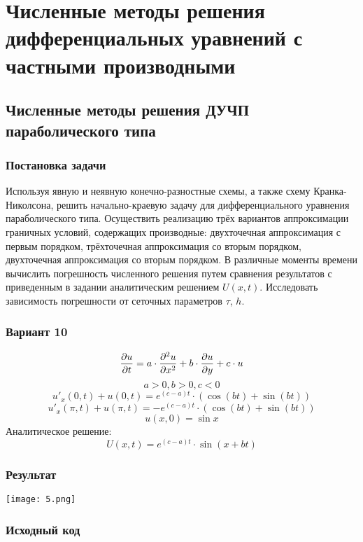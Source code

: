 \graphicspath{{images/}}

\section{Численные методы решения дифференциальных уравнений с частными производными}

\subsection{Численные методы решения ДУЧП параболического типа}

\subsubsection{Постановка задачи}
Используя явную и неявную конечно-разностные схемы, а также схему Кранка-Николсона, решить начально-краевую задачу для дифференциального уравнения параболического типа. Осуществить реализацию трёх вариантов аппроксимации граничных условий, содержащих производные: двухточечная аппроксимация с первым порядком, трёхточечная аппроксимация со вторым порядком, двухточечная аппроксимация со вторым порядком. В различные моменты времени вычислить погрешность численного решения путем сравнения результатов с приведенным в задании аналитическим решением $U(x, t)$. Исследовать зависимость погрешности от сеточных параметров $\tau$, $h$.

\subsubsection{Вариант 10}
$$ {{\partial u} \over {\partial t}} = a \cdot {{\partial^2 u} \over {\partial x^2}} + b \cdot {{\partial u} \over {\partial y}} + c \cdot u $$
$$ a > 0, b > 0, c < 0 $$
$$ u'_x(0, t) + u(0, t) = e ^ {(c - a) t} \cdot (\cos(bt) + \sin(bt)) $$
$$ u'_x(\pi, t) + u(\pi, t) = -e ^ {(c - a) t} \cdot (\cos(bt) + \sin(bt)) $$
$$ u(x, 0) = \sin{x} $$
Аналитическое решение:
$$ U(x, t) = e ^ {(c - a) t} \cdot \sin(x + bt) $$
\pagebreak

\subsubsection{Результат}
\begin{center}
    \texttt{[image: 5.png]}\newline\noindent
\end{center}
\pagebreak

\subsubsection{Исходный код}

\pagebreak
